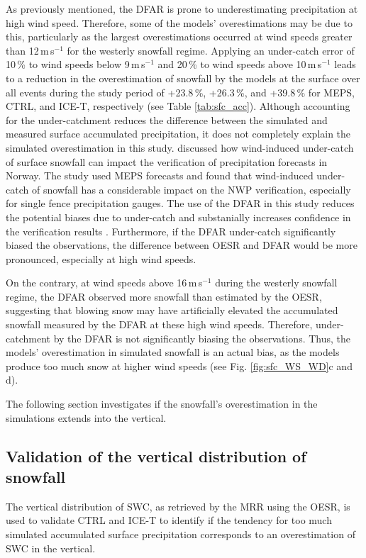\documentclass{ametsocV5}
\begin{document}
		As previously mentioned, the DFAR is prone to underestimating precipitation at high wind speed. Therefore, some of the models' overestimations may be due to this, particularly as the largest overestimations occurred at wind speeds greater than 12\,m\,s$^{-1}$ for the westerly snowfall regime. Applying an under-catch error of 10\,\% to wind speeds below 9\,m\,s$^{-1}$ and 20\,\% to wind speeds above 10\,m\,s$^{-1}$ leads to a reduction in the overestimation of snowfall by the models at the surface over all events during the study period of +23.8\,\%, +26.3\,\%, and +39.8\,\% for MEPS, CTRL, and ICE-T, respectively (see Table \ref{tab:sfc_acc}). Although accounting for the under-catchment reduces the difference between the simulated and measured surface accumulated precipitation, it does not completely explain the simulated overestimation in this study. \citet{koltzow_verification_2020} discussed how wind-induced under-catch of surface snowfall can impact the verification of precipitation forecasts in Norway. The study used MEPS forecasts and found that wind-induced under-catch of snowfall has a considerable impact on the NWP verification, especially for single fence precipitation gauges. The use of the DFAR in this study reduces the potential biases due to under-catch and substanially increases confidence in the verification results \citep{koltzow_verification_2020}. Furthermore, if the DFAR under-catch significantly biased the observations, the difference between OESR and DFAR would be more pronounced, especially at high wind speeds. 
		
		On the contrary, at wind speeds above 16\,m\,s$^{-1}$ during the westerly snowfall regime, the DFAR observed more snowfall than estimated by the OESR, suggesting that blowing snow may have artificially elevated the accumulated snowfall measured by the DFAR at these high wind speeds. Therefore, under-catchment by the DFAR is not significantly biasing the observations. Thus, the models' overestimation in simulated snowfall is an actual bias, as the models produce too much snow at higher wind speeds (see Fig. \ref{fig:sfc_WS_WD}c and d).

		The following section investigates if the snowfall's overestimation in the simulations extends into the vertical.
				

	\subsection{Validation of the vertical distribution of snowfall}\label{sec:res:swc}
		The vertical distribution of SWC, as retrieved by the MRR using the OESR, is used to validate CTRL and ICE-T to identify if the tendency for too much simulated accumulated surface precipitation corresponds to an overestimation of SWC in the vertical.
\end{document}
